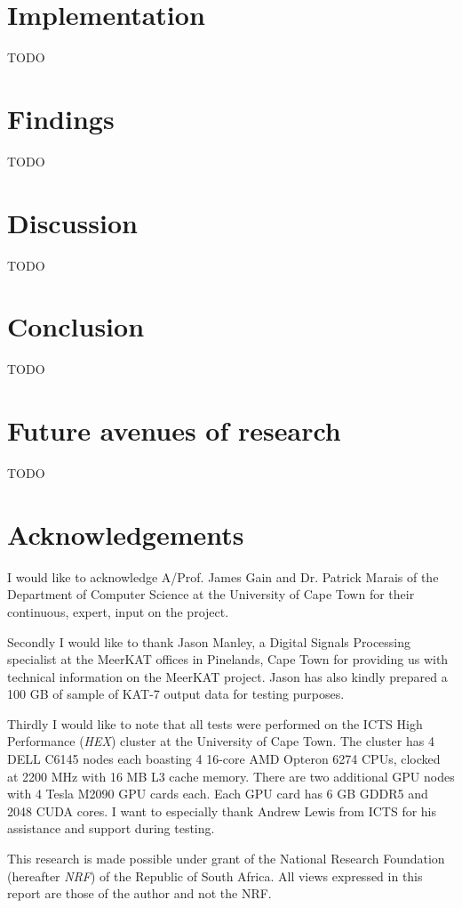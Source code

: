 \documentclass{acm_proc_article-sp}
\begin{document}
\section{Implementation}
{\color{red}TODO}
\section{Findings}
{\color{red}TODO}
\section{Discussion}
{\color{red}TODO}
\section{Conclusion}
{\color{red}TODO}
\section{Future avenues of research}
{\color{red}TODO}
\section{Acknowledgements}
I would like to acknowledge A/Prof. James Gain and Dr. Patrick Marais of the Department of Computer Science at the University of Cape Town for their continuous, expert, input on the project.

Secondly I would like to thank Jason Manley, a Digital Signals Processing specialist at the MeerKAT offices in Pinelands, Cape Town for providing us with technical information
on the MeerKAT project. Jason has also kindly prepared a 100 GB of sample of KAT-7 output data for testing purposes.

Thirdly I would like to note that all tests were performed on the ICTS High Performance (\textit{HEX}) cluster at the University of Cape Town. The cluster has 4 DELL C6145 nodes each boasting 4 16-core
AMD Opteron 6274 CPUs, clocked at 2200 MHz with 16 MB L3 cache memory. There are two additional GPU nodes with 4 Tesla M2090 GPU cards each. Each GPU card has 6 GB GDDR5 and 2048 CUDA cores. I want to 
especially thank Andrew Lewis from ICTS for his assistance and support during testing.

This research is made possible under grant of the National Research Foundation (hereafter \textit{NRF}) of the Republic of South Africa. All views expressed in this report are those of the author and not the NRF.


\end{document}
